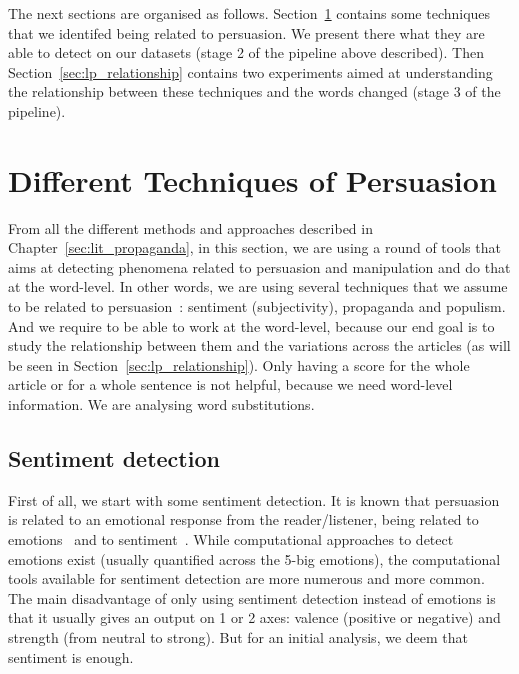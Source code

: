 The next sections are organised as follows. Section~\ref{sec:lp_techniques} contains some techniques that we identifed being related to persuasion. We present there what they are able to detect on our datasets (stage 2 of the pipeline above described). Then Section~\ref{sec:lp_relationship} contains two experiments aimed at understanding the relationship between these techniques and the words changed (stage 3 of the pipeline).

\section{Different Techniques of Persuasion}
\label{sec:lp_techniques}


From all the different methods and approaches described in Chapter~\ref{sec:lit_propaganda}, in this section, we are using a round of tools that aims at detecting phenomena related to persuasion and manipulation and do that at the word-level.
In other words, we are using several techniques that we assume to be related to persuasion~\cite{gass2018persuasion}: sentiment (subjectivity), propaganda and populism.
And we require to be able to work at the word-level, because our end goal is to study the relationship between them and the variations across the articles (as will be seen in Section~\ref{sec:lp_relationship}). Only having a score for the whole article or for a whole sentence is not helpful, because we need word-level information. We are analysing word substitutions.

\subsection{Sentiment detection}

First of all, we start with some sentiment detection. It is known that persuasion is related to an emotional response from the reader/listener, being related to emotions~\citep{rocklage2018persuasion,petty2015emotion,desteno2004discrete} and to sentiment~\citep{gatti2014sentiment}.
While computational approaches to detect emotions exist (usually quantified across the 5-big emotions), the computational tools available for sentiment detection are more numerous and more common. The main disadvantage of only using sentiment detection instead of emotions is that it usually gives an output on 1 or 2 axes: valence (positive or negative) and strength (from neutral to strong). But for an initial analysis, we deem that sentiment is enough.

